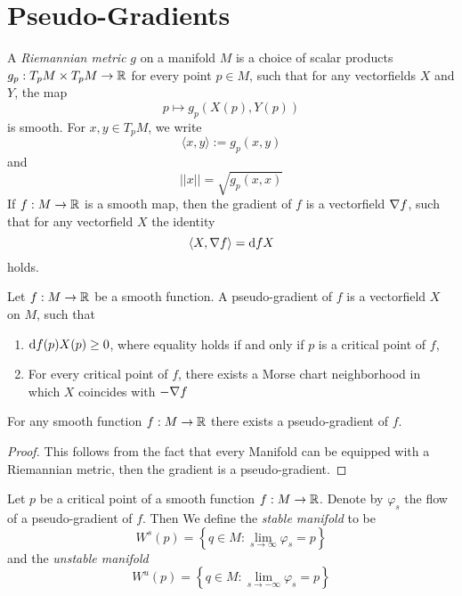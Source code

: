 \section{Pseudo-Gradients}

\begin{definition}
    A \textit{Riemannian metric} $g$ on a manifold $M$ is a choice of scalar products
    $g_p: T_pM \times T_pM \to { \mathbb R }$ for every point $p \in M$, such that for any vectorfields
    $X$ and $Y$, the map
    \[ p \mapsto g_p(X(p), Y(p)) \]
    is smooth. For $x, y \in T_pM$, we write 
    \[ \langle x, y \rangle := g_p(x, y)\]
    and 
    \[ || x || = \sqrt{g_p(x, x)} \]
    If $f: M \to { \mathbb R }$ is a smooth map, then the gradient of $f$ is a vectorfield ${ \nabla } f$, such
    that for any vectorfield $X$ the identity
    \[ \langle X, { \nabla } f \rangle = { \operatorname{d} } f X \]
    holds.
\end{definition}

\begin{definition}
    Let $f: M \to { \mathbb R }$ be a smooth function. A pseudo-gradient of $f$ is a vectorfield
    $X$ on $M$, such that 
    \begin{enumerate}
        \item ${ \operatorname{d} } f(p) X(p) \geq 0$, where equality holds if and only if $p$ is a 
            critical point of $f$,
        \item For every critical point of $f$, there exists a Morse chart neighborhood 
            in which $X$ coincides with $-{ \nabla } f$
    \end{enumerate}
\end{definition}

\begin{lemma}
    For any smooth function $f: M \to { \mathbb R }$ there exists a pseudo-gradient of $f$.
\end{lemma}

\begin{proof}
    This follows from the fact that every Manifold can be equipped with a Riemannian
    metric, then the gradient is a pseudo-gradient.
\end{proof}

\begin{definition}
    Let $p$ be a critical point of a smooth function $f: M \to { \mathbb R }$. Denote by $\varphi_s$ the
    flow of a pseudo-gradient of $f$. Then We define the \textit{stable manifold} to be
    \[ W^s(p) = \left\{ q \in M: \lim_{s \to \infty} \varphi_s = p \right\} \]
    and the \textit{unstable manifold}
    \[ W^u(p) = \left\{ q \in M: \lim_{s \to -\infty} \varphi_s = p \right\} \]
\end{definition}

